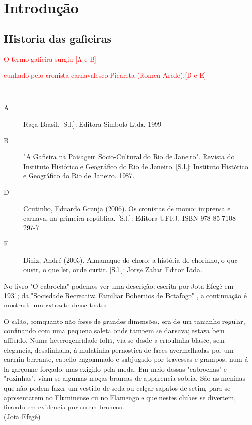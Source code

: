 
\chapter{Introdução}

\section{Historia das gafieiras}

\textcolor{red}{O termo gafieira surgiu [A e B]}

\textcolor{red}{cunhado pelo cronista carnavalesco Picareta (Romeu Arede),[D e E]}


~\\


\begin{description}
\item [A] Raça Brasil. [S.l.]: Editora Simbolo Ltda. 1999

\item [B] "A Gafieira na Paisagem Socio-Cultural do Rio de Janeiro". Revista do Instituto Histórico e Geográfico do Rio de Janeiro. [S.l.]: Instituto Histórico e Geográfico do Rio de Janeiro. 1987.



\item [D] Coutinho, Eduardo Granja (2006). Os cronistas de momo: imprensa e carnaval na primeira república. [S.l.]: Editora UFRJ. ISBN 978-85-7108-297-7

\item [E] Diniz, André (2003). Almanaque do choro: a história do chorinho, o que ouvir, o que ler, onde curtir. [S.l.]: Jorge Zahar Editor Ltda.

\end{description}


No livro "O cabrocha" podemos ver uma descrição; escrita  por Jota Efegê em 1931; 
da "Sociedade Recreativa Familiar Bohemios de Botafogo" \cite{jotaefege},
a continuação é mostrado um extracto desse texto:

\begin{tcolorbox}[colback=lowgray,colframe=lowgray]%
O salão, comquanto não fosse de grandes dimensões, era
de um tamanho regular, confinando com uma pequena saleta
onde tambem se dansava; estava bem affluido. Numa
heterogeneidade foliã, via-se desde a crioulinha blasée, sem
elegancia, desalinhada, á mulatinha pernostica de faces
avermelhadas por um carmin berrante, cabello engommado e
subjugado por travessas e grampos, num á la garçonne
forçado, mas exigido pela moda. Em meio dessas "cabrochas"
e "roxinhas", viam-se algumas moças brancas de apparencia
sobria. São as meninas que não podem fazer um vestido de
seda ou calçar sapatos de setim, para se apresentarem no
Fluminense ou no Flamengo e que nestes clubes se divertem,
ficando em evidencia por serem brancas.
~\\
(Jota Efegê)
\end{tcolorbox}

